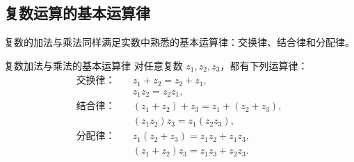 \subsection{复数运算的基本运算律}

复数的加法与乘法同样满足实数中熟悉的基本运算律：交换律、结合律和分配律。

\begin{dingli}{复数加法与乘法的基本运算律}{}
对任意复数 $z_1,z_2,z_3$，都有下列运算律：
\begin{align}
    \text{交换律：}\quad
    & z_1+z_2=z_2+z_1, \label{eq:complex-add-commutative}\\
    & z_1z_2=z_2z_1, \label{eq:complex-mul-commutative}\\[4pt]
    \text{结合律：}\quad
    & (z_1+z_2)+z_3=z_1+(z_2+z_3), \label{eq:complex-add-associative}\\
    & (z_1z_2)z_3=z_1(z_2z_3), \label{eq:complex-mul-associative}\\[4pt]
    \text{分配律：}\quad
    & z_1(z_2+z_3)=z_1z_2+z_1z_3, \label{eq:complex-left-distributive}\\
    & (z_1+z_2)z_3=z_1z_3+z_2z_3. \label{eq:complex-right-distributive}
\end{align}
\end{dingli}

